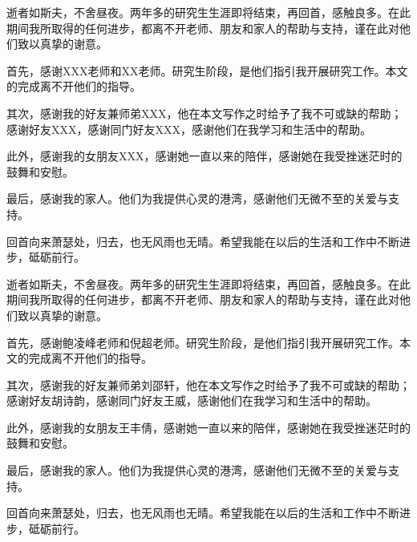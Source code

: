 \cleardoublepage
{}

{%


\hspace*{\fill}
    逝者如斯夫，不舍昼夜。两年多的研究生生涯即将结束，再回首，感触良多。在此期间我所取得的任何进步，都离不开老师、朋友和家人的帮助与支持，谨在此对他们致以真挚的谢意。

    首先，感谢XXX老师和XX老师。研究生阶段，是他们指引我开展研究工作。本文的完成离不开他们的指导。

    其次，感谢我的好友兼师弟XXX，他在本文写作之时给予了我不可或缺的帮助；感谢好友XXX，感谢同门好友XXX，感谢他们在我学习和生活中的帮助。

    此外，感谢我的女朋友XXX，感谢她一直以来的陪伴，感谢她在我受挫迷茫时的鼓舞和安慰。

    最后，感谢我的家人。他们为我提供心灵的港湾，感谢他们无微不至的关爱与支持。

    回首向来萧瑟处，归去，也无风雨也无晴。希望我能在以后的生活和工作中不断进步，砥砺前行。

}
{%



\hspace*{\fill}
    逝者如斯夫，不舍昼夜。两年多的研究生生涯即将结束，再回首，感触良多。在此期间我所取得的任何进步，都离不开老师、朋友和家人的帮助与支持，谨在此对他们致以真挚的谢意。

    首先，感谢鲍凌峰老师和倪超老师。研究生阶段，是他们指引我开展研究工作。本文的完成离不开他们的指导。

    其次，感谢我的好友兼师弟刘邵轩，他在本文写作之时给予了我不可或缺的帮助；感谢好友胡诗韵，感谢同门好友王威，感谢他们在我学习和生活中的帮助。

    此外，感谢我的女朋友王丰倩，感谢她一直以来的陪伴，感谢她在我受挫迷茫时的鼓舞和安慰。

    最后，感谢我的家人。他们为我提供心灵的港湾，感谢他们无微不至的关爱与支持。

    回首向来萧瑟处，归去，也无风雨也无晴。希望我能在以后的生活和工作中不断进步，砥砺前行。

}
